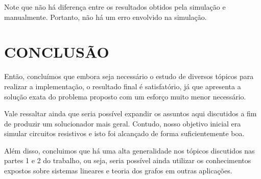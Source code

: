 \documentclass[twocolumn, 10pt]{extarticle}
\begin{document}
Note que não há diferença entre os resultados obtidos pela simulação e manualmente. Portanto, não há um erro envolvido na simulação.

\section{CONCLUSÃO}

Então, concluímos que embora seja necessário o estudo de diversos tópicos para realizar a implementação, o resultado final é satisfatório, já que apresenta a solução exata do problema proposto com um esforço muito menor necessário. 

Vale ressaltar ainda que seria possível expandir os assuntos aqui discutidos a fim de produzir um solucionador mais geral. Contudo, nosso objetivo inicial era simular circuitos resistivos e isto foi alcançado de forma suficientemente boa.

Além disso, concluimos que há uma alta generalidade nos tópicos discutidos nas partes 1 e 2 do trabalho, ou seja, seria possível ainda utilizar os conhecimentos expostos sobre sistemas lineares e teoria dos grafos em outras aplicações.

\renewcommand{\refname}{REFERÊNCIAS}

\end{document}
